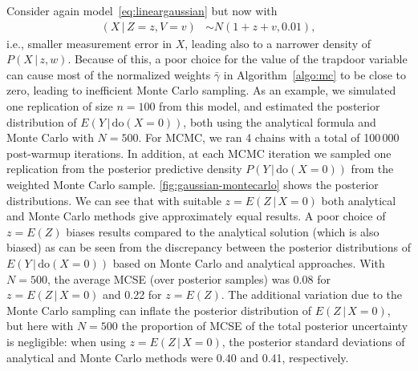 \documentclass[11pt,a4paper,twoside]{article}
\newcommand{\+}[1]{\ensuremath{\mathbf{#1}}}
\newcommand{\doo}{\textrm{do}}
\newcommand{\given}{{ \, | \, }}
\begin{document}
	Consider again model~\eqref{eq:lineargaussian} but now with
	\begin{equation*}
	\begin{aligned}
	(X \given Z = z, V = v) &\sim N(1 + z + v, 0.01),
	\end{aligned}
	\end{equation*}
	i.e., smaller measurement error in $X$, leading also to a narrower density of $P(X \given z, w)$. Because of this, a poor choice for the value of the trapdoor variable can cause most of the normalized weights $\bar \gamma$ in Algorithm~\ref{algo:mc} to be close to zero, leading to inefficient Monte Carlo sampling. As an example, we simulated one replication of size $n=100$ from this model, and estimated the posterior distribution of $E(Y \given \doo(X = 0))$, both using the analytical formula and Monte Carlo with $N = 500$. For MCMC, we ran 4 chains with a total of 100\,000 post-warmup iterations. In addition, at each MCMC iteration we sampled one replication from the posterior predictive density $P(Y \given \doo(X = 0))$ from the weighted Monte Carlo sample. \autoref{fig:gaussian-montecarlo} shows the posterior distributions. We can see that with suitable $z = E(Z \given  X = 0)$ both analytical and Monte Carlo methods give approximately equal results. A poor choice of $z=E(Z)$ biases results compared to the analytical solution (which is also biased) as can be seen from the discrepancy between the posterior distributions of $E(Y \given \doo(X = 0))$ based on Monte Carlo and analytical approaches. With $N = 500$, the average MCSE (over posterior samples) was 0.08 for $z = E(Z \given  X = 0)$ and 0.22 for $z=E(Z)$. The additional variation due to the Monte Carlo sampling can inflate the posterior distribution of $E(Z \given  X = 0)$, but here with $N = 500$ the proportion of MCSE of the total posterior uncertainty is negligible: when using $z = E(Z \given X = 0)$, the posterior standard deviations of analytical and Monte Carlo methods were 0.40 and 0.41, respectively.
\end{document}
